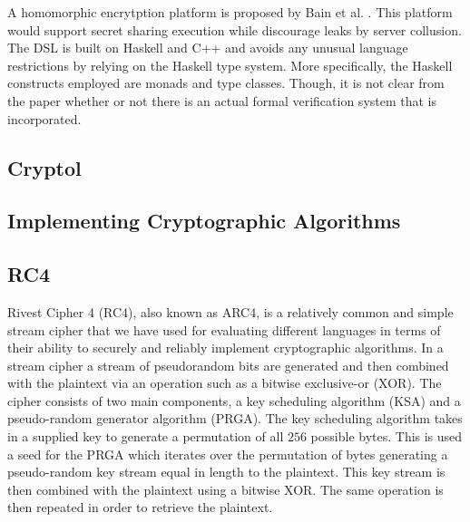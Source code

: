 A homomorphic encrytption platform is proposed by Bain et al. \cite{Bain}. This platform would support secret sharing execution while discourage leaks by server collusion. The DSL is built on Haskell and C++ and avoids any unusual language restrictions by relying on the Haskell type system. More specifically, the Haskell constructs employed are monads and type classes. Though, it is not clear from the paper whether or not there is an actual formal verification system that is incorporated.  


\subsection{Cryptol}

\subsection{Implementing Cryptographic Algorithms}

\subsection{RC4}

Rivest Cipher 4 (RC4), also known as ARC4, is a relatively common and simple stream cipher that we have 
used for evaluating different languages in terms of their ability to securely and reliably implement 
cryptographic algorithms. In a stream cipher a stream of pseudorandom bits are generated and then combined 
with the plaintext via an operation such as a bitwise exclusive-or (XOR). The cipher consists of two main 
components, a key scheduling algorithm (KSA) and a pseudo-random generator algorithm (PRGA). The key scheduling algorithm 
takes in a supplied key to generate a permutation of all $256$ possible bytes. This is used a seed for the 
PRGA which iterates over the permutation of bytes generating a pseudo-random key stream equal in length to 
the plaintext. This key stream is then combined with the plaintext using a bitwise XOR. The same operation is 
then repeated in order to retrieve the plaintext.
